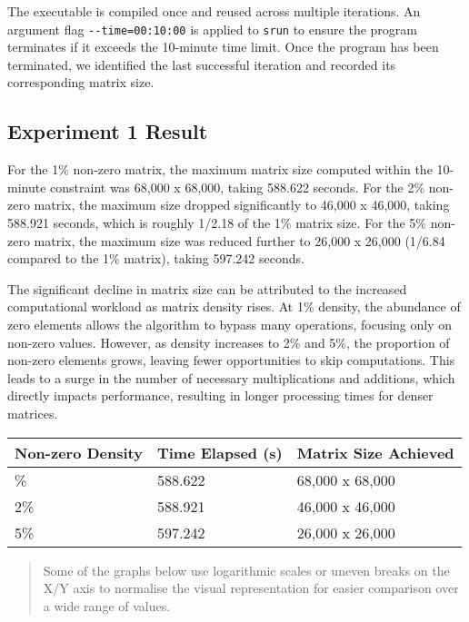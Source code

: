 \documentclass[
]{article}
\begin{document}
The executable is compiled once and reused across multiple iterations.
An argument flag \texttt{-\/-time=00:10:00} is applied to \texttt{srun}
to ensure the program terminates if it exceeds the 10-minute time limit.
Once the program has been terminated, we identified the last successful
iteration and recorded its corresponding matrix size.

\subsection{Experiment 1 Result}\label{experiment-1-result}

For the 1\% non-zero matrix, the maximum matrix size computed within the
10-minute constraint was 68,000 x 68,000, taking 588.622 seconds. For
the 2\% non-zero matrix, the maximum size dropped significantly to
46,000 x 46,000, taking 588.921 seconds, which is roughly 1/2.18 of the
1\% matrix size. For the 5\% non-zero matrix, the maximum size was
reduced further to 26,000 x 26,000 (1/6.84 compared to the 1\% matrix),
taking 597.242 seconds.

The significant decline in matrix size can be attributed to the
increased computational workload as matrix density rises. At 1\%
density, the abundance of zero elements allows the algorithm to bypass
many operations, focusing only on non-zero values. However, as density
increases to 2\% and 5\%, the proportion of non-zero elements grows,
leaving fewer opportunities to skip computations. This leads to a surge
in the number of necessary multiplications and additions, which directly
impacts performance, resulting in longer processing times for denser
matrices.

\begin{longtable}[]{@{}lll@{}}
\toprule\noalign{}
Non-zero Density & Time Elapsed (s) & Matrix Size Achieved \\
\midrule\noalign{}
\endhead
\bottomrule\noalign{}
\endlastfoot
1\% & 588.622 & 68,000 x 68,000 \\
2\% & 588.921 & 46,000 x 46,000 \\
5\% & 597.242 & 26,000 x 26,000 \\
\end{longtable}

\begin{quote}
Some of the graphs below use logarithmic scales or uneven breaks on the
X/Y axis to normalise the visual representation for easier comparison
over a wide range of values.
\end{quote}
\end{document}
